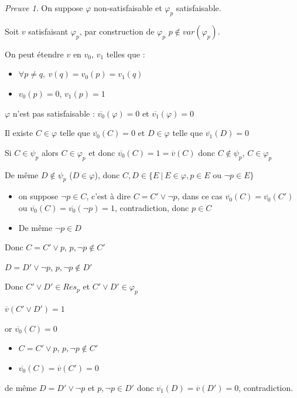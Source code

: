 \documentclass[]{article}
\theoremstyle{remark}
\newtheorem{myproof}{Preuve}
\theoremstyle{definition}
\begin{document}
\begin{myproof}
	On suppose $\varphi$ non-satisfaisable et $\varphi_p$ satisfaisable.
	
	Soit $v$ satisfaisant $\varphi_p$, par construction de $\varphi_p$ $p \notin var(\varphi_p)$.
	
	On peut étendre $v$ en $v_0$, $v_1$ telles que :
	\begin{itemize}
		\item $\forall p \neq q, ~ v(q) = v_0(p) = v_1(q)$
		\item $v_0(p) = 0$, $v_1(p) = 1$
	\end{itemize}

	$\varphi$ n'est pas satisfaisable : $\overline{v_0}(\varphi) = 0$ et $\overline{v_1}(\varphi)=0$
	
	Il existe $C \in \varphi$ telle que $\overline{v_0}(C) = 0$ et $D \in \varphi$ telle que $\overline{v_1}(D) = 0$
	
	Si $C \in \psi_p$ alors $C \in \varphi_p$ et donc $\overline{v_0}(C)=1=\overline{v}(C)$ donc $C \notin \psi_p$, $C \in \varphi_p$
	
	De même $D \notin \psi_p$ ($D \in \varphi$), donc $C, D \in \{E ~ | ~ E \in \varphi, p \in E \text{ ou }\neg p \in E \}$
	
	\begin{itemize}
		\item on suppose $\neg p \in C$, c'est à dire $C = C' \lor \neg p$, dans ce cas $\overline{v_0}(C) = \overline{v_0}(C')$ ou $\overline{v_0}(C) = \overline{v_0}(\neg p)=1$, contradiction, donc $p \in C$
		
		\item De même $\neg p \in D$
	\end{itemize}
	
	Donc $C = C' \lor p$, $p,\neg p \notin C'$
	
	$D = D' \lor \neg p$, $p, \neg p \notin D'$
	
	Donc $C' \lor D' \in Res_p$ et $C' \lor D' \in \varphi_p$
	
	$\overline{v}(C' \lor D') = 1$
	
	or $\overline{v_0}(C) = 0$
	
	\begin{itemize}
		\item $C = C' \lor p$, $p, \neg p \notin C'$
		\item $\overline{v_0}(C) = \overline{v}(C') = 0$
	\end{itemize}

	de même $D = D' \lor \neg p$ et $p, \neg p \in D'$ donc $\overline{v_1}(D) = \overline{v}(D') = 0$, contradiction.
\end{myproof}
\end{document}
